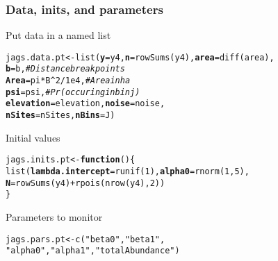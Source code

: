 \documentclass[color=usenames,dvipsnames]{beamer}\usepackage[]{graphicx}\usepackage[]{xcolor}
\makeatletter
\newcommand{\hlnum}[1]{\textcolor[rgb]{0.69,0.494,0}{#1}}%
\newcommand{\hlstr}[1]{\textcolor[rgb]{0.749,0.012,0.012}{#1}}%
\newcommand{\hlcom}[1]{\textcolor[rgb]{0.514,0.506,0.514}{\textit{#1}}}%
\newcommand{\hlopt}[1]{\textcolor[rgb]{0,0,0}{#1}}%
\newcommand{\hlstd}[1]{\textcolor[rgb]{0,0,0}{#1}}%
\newcommand{\hlkwa}[1]{\textcolor[rgb]{0,0,0}{\textbf{#1}}}%
\newcommand{\hlkwb}[1]{\textcolor[rgb]{0,0.341,0.682}{#1}}%
\newcommand{\hlkwc}[1]{\textcolor[rgb]{0,0,0}{\textbf{#1}}}%
\newcommand{\hlkwd}[1]{\textcolor[rgb]{0.004,0.004,0.506}{#1}}%
\newenvironment{kframe}{%
 \def\at@end@of@kframe{}%
 \ifinner\ifhmode%
  \def\at@end@of@kframe{\end{minipage}}%
  \begin{minipage}{\columnwidth}%
 \fi\fi%
 \def\FrameCommand##1{\hskip\@totalleftmargin \hskip-\fboxsep
 \colorbox{shadecolor}{##1}\hskip-\fboxsep
     \hskip-\linewidth \hskip-\@totalleftmargin \hskip\columnwidth}%
 \MakeFramed {\advance\hsize-\width
   \@totalleftmargin\z@ \linewidth\hsize
   \@setminipage}}%
 {\par\unskip\endMakeFramed%
 \at@end@of@kframe}
\newenvironment{knitrout}{}{} %
\makeatother
\begin{document}
\begin{frame}[fragile]
  \frametitle{Data, inits, and parameters}
  Put data in a named list
  \vspace{-12pt}
\begin{knitrout}\footnotesize
{}\color{fgcolor}\begin{kframe}
\begin{alltt}
\hlstd{jags.data.pt} \hlkwb{<-} \hlkwd{list}\hlstd{(}\hlkwc{y}\hlstd{=y4,} \hlkwc{n}\hlstd{=}\hlkwd{rowSums}\hlstd{(y4),} \hlkwc{area}\hlstd{=}\hlkwd{diff}\hlstd{(area),}
                     \hlkwc{b}\hlstd{=b,}              \hlcom{# Distance break points}
                     \hlkwc{Area}\hlstd{=pi}\hlopt{*}\hlstd{B}\hlopt{^}\hlnum{2}\hlopt{/}\hlnum{1e4}\hlstd{,}  \hlcom{# Area in ha}
                     \hlkwc{psi}\hlstd{=psi,}          \hlcom{# Pr(occuring in bin j)}
                     \hlkwc{elevation}\hlstd{=elevation,} \hlkwc{noise}\hlstd{=noise,}
                     \hlkwc{nSites}\hlstd{=nSites,} \hlkwc{nBins}\hlstd{=J)}
\end{alltt}
\end{kframe}
\end{knitrout}
\pause
\vfill
  Initial values
  \vspace{-12pt}
\begin{knitrout}\footnotesize
{}\color{fgcolor}\begin{kframe}
\begin{alltt}
\hlstd{jags.inits.pt} \hlkwb{<-} \hlkwa{function}\hlstd{() \{}
    \hlkwd{list}\hlstd{(}\hlkwc{lambda.intercept}\hlstd{=}\hlkwd{runif}\hlstd{(}\hlnum{1}\hlstd{),} \hlkwc{alpha0}\hlstd{=}\hlkwd{rnorm}\hlstd{(}\hlnum{1}\hlstd{,} \hlnum{5}\hlstd{),}
         \hlkwc{N}\hlstd{=}\hlkwd{rowSums}\hlstd{(y4)}\hlopt{+}\hlkwd{rpois}\hlstd{(}\hlkwd{nrow}\hlstd{(y4),} \hlnum{2}\hlstd{))}
\hlstd{\}}
\end{alltt}
\end{kframe}
\end{knitrout}
\pause
\vfill
  Parameters to monitor
  \vspace{-12pt}
\begin{knitrout}\small
{}\color{fgcolor}\begin{kframe}
\begin{alltt}
\hlstd{jags.pars.pt} \hlkwb{<-} \hlkwd{c}\hlstd{(}\hlstr{"beta0"}\hlstd{,} \hlstr{"beta1"}\hlstd{,}
                  \hlstr{"alpha0"}\hlstd{,} \hlstr{"alpha1"}\hlstd{,} \hlstr{"totalAbundance"}\hlstd{)}
\end{alltt}
\end{kframe}
\end{knitrout}
\end{frame}
\end{document}
